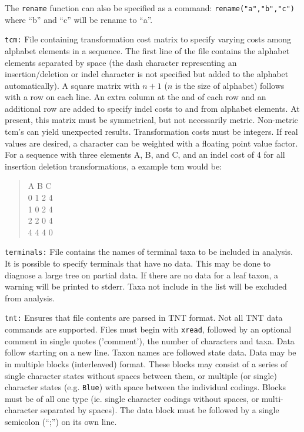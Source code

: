 \documentclass[11pt]{article}
\begin{document}
			 The \texttt{rename} function can also be specified as a command:  \texttt{rename("a","b","c")} where ``b'' and ``c'' will be rename to ``a''. 
			 
			\smallskip		
			\noindent \texttt{tcm:} File containing transformation cost matrix to specify varying costs among alphabet elements in a sequence.  The first line of the file 
			contains the alphabet elements separated by space (the dash character representing an insertion/deletion or indel character is not specified but added to the alphabet automatically).
			A square matrix with $n + 1$ ($n$ is the size of alphabet) follows with a row on each line.  An extra column at the and of each row and an additional row are 
			added to specify indel costs to and from alphabet elements.  At present, this matrix must be symmetrical, but not necessarily metric.  Non-metric tcm's can
			yield unexpected results. Transformation costs must be integers.  If real values are desired, a character can be weighted with a floating point value factor. For a sequence with three elements A, B, and C,  and an indel cost of 4 for all insertion deletion transformations, a example tcm would  be:
			\begin{quote}
			A B C\\
			0 1 2 4\\
			1 0 2 4\\
			2 2 0 4\\
		    4 4 4 0\\
	   		 \end{quote}
   		 
   		 	\smallskip		
   		 	\noindent \texttt{terminals:}  File contains the names of terminal taxa to be included in analysis.  It is possible to specify terminals that have no data.  This may be done to diagnose a large tree on partial data.  If there are no data for a leaf taxon, a warning will be printed to stderr.  Taxa not include in the list will be excluded from analysis. 
	   
			\smallskip		
			\noindent \texttt{tnt:} Ensures that file contents are parsed in TNT \citep{Goloboffetal2008} format.
			Not all TNT data commands are supported.  Files must begin with \texttt{xread}, followed by an optional comment in single quotes ('comment'), the number of characters and taxa.  Data follow starting on a new
			line.  Taxon names are followed state data.  Data may be in multiple blocks (interleaved) format.  These
			blocks may consist of a series of single character states  without spaces between them, or multiple (or single) character states (e.g. \texttt{Blue}) with space between the individual codings. Blocks must be of all
			one type (ie. single character codings without spaces, or multi-character separated by spaces).
			The data block must be followed by a single semicolon (``;'') on its own line.
			
\end{document}
